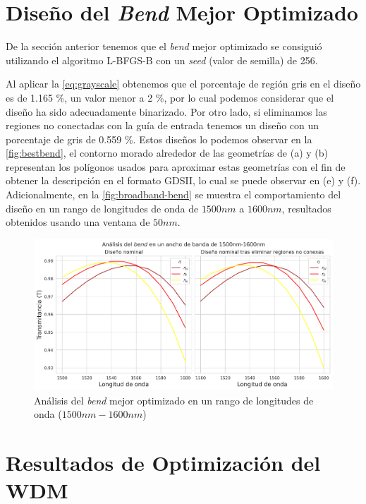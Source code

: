 \section{Diseño del \emph{Bend} Mejor Optimizado}\label{sec:best-bend}

De la sección anterior tenemos que el \emph{bend} mejor optimizado se consiguió
utilizando el algoritmo L-BFGS-B con un \emph{seed} (valor de semilla) de 256.

Al aplicar la \autoref{eq:grayscale} obtenemos que el porcentaje de región gris en el diseño
es de 1.165 \%, un valor menor a 2 \%, por lo cual podemos considerar que el diseño ha sido
adecuadamente binarizado. 
Por otro lado, si eliminamos las regiones no conectadas con la guía de entrada
tenemos un diseño con un porcentaje de gris de 0.559 \%.
Estos diseños lo podemos observar en la \autoref{fig:bestbend}, 
el contorno morado alrededor de las geometrías de (a) y (b) representan los polígonos
usados para aproximar estas geometrías con el fin de obtener la descripción en el formato
GDSII, lo cual se puede observar en (e) y (f).
Adicionalmente, en la \autoref{fig:broadband-bend} se muestra el comportamiento del diseño
en un rango de longitudes de onda de $1500nm$ a $1600 nm$, resultados obtenidos usando una ventana de $50nm$.

\begin{figure}[H]
  \centering
  \includegraphics[width=\textwidth]{image/results/bend/best/broadband-bend.png}
  \caption{Análisis del \emph{bend} mejor optimizado en un rango de longitudes de onda ($1500 nm-1600 nm$)}
  \label{fig:broadband-bend}
\end{figure}


\section{Resultados de Optimización del WDM}\label{sec:results-wdm}


